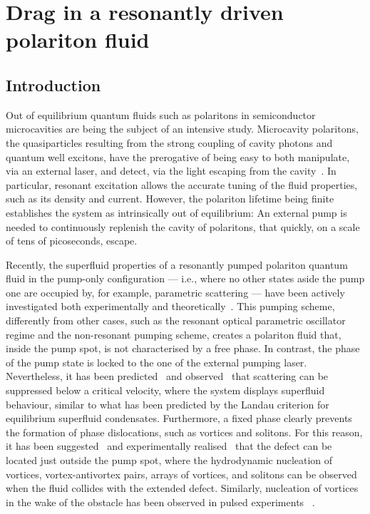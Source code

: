 
\chapter{Drag in a resonantly driven polariton fluid}
\label{cha:drag}

\section{Introduction}
\label{sec:intro}

Out of equilibrium quantum fluids such as polaritons in semiconductor
microcavities are being the subject of an intensive study. Microcavity
polaritons, the quasiparticles resulting from the strong coupling of
cavity photons and quantum well excitons, have the prerogative of
being easy to both manipulate, via an external laser, and detect, via
the light escaping from the cavity~\cite{9780199228942}. In
particular, resonant excitation allows the accurate tuning of the
fluid properties, such as its density and current. However, the
polariton lifetime being finite establishes the system as
intrinsically out of equilibrium: An external pump is needed to
continuously replenish the cavity of polaritons, that quickly, on a
scale of tens of picoseconds, escape.

Recently, the superfluid properties of a resonantly pumped polariton
quantum fluid in the pump-only configuration --- i.e., where no other
states aside the pump one are occupied by, for example, parametric
scattering --- have been actively investigated both experimentally and
theoretically~\cite{Carusotto_2004,Ciuti_2005,Amo_2009,Cancellieri_2010,Pigeon_2011,Amo_2011,Nardin_2011,Sanvitto_2011}. This
pumping scheme, differently from other cases, such as the resonant
optical parametric oscillator regime and the non-resonant pumping
scheme, creates a polariton fluid that, inside the pump spot, is not
characterised by a free phase. In contrast, the phase of the pump
state is locked to the one of the external pumping
laser. Nevertheless, it has been
predicted~\cite{Carusotto_2004,Ciuti_2005} and
observed~\cite{Amo_2009} that scattering can be suppressed below a
critical velocity, where the system displays superfluid behaviour,
similar to what has been predicted by the Landau criterion for
equilibrium superfluid condensates. Furthermore, a fixed phase clearly
prevents the formation of phase dislocations, such as vortices and
solitons. For this reason, it has been suggested~\cite{Pigeon_2011}
and experimentally realised~\cite{Amo_2011} that the defect can be
located just outside the pump spot, where the hydrodynamic nucleation
of vortices, vortex-antivortex pairs, arrays of vortices, and solitons
can be observed when the fluid collides with the extended
defect. Similarly, nucleation of vortices in the wake of the obstacle
has been observed in pulsed experiments
~\cite{Nardin_2011,Sanvitto_2011}.

